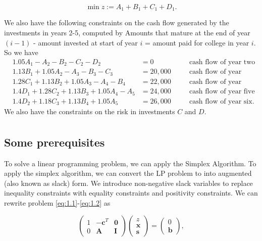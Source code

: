 \documentclass[12pt,english]{article}
\begin{document}
$$
\min z := A_1 + B_1 + C_1 + D_1.
$$

We also have the following constraints on the cash flow generated by the investments in years 2-5, computed by Amounts that mature at the end of year $(i-1)$ - amount invested at start of year $i$ = amount paid for college in year $i$. So we have
$$
\begin{aligned}
&1.05A_1 - A_2 - B_2 - C_2 - D_2 			&= 0 	\quad 	&& \text{cash flow of year two} \\
&1.13B_1 +1.05A_2 - A_3 - B_3 - C_3 		&= 20,000 \quad 	&& \text{cash flow of year three}\\
&1.28C_1 + 1.13B_2 + 1.05A_3 - A_4 - B_4 	&= 22,000	 \quad	&& \text{cash flow of year four} \\
&1.4D_1 + 1.28C_2 + 1.13B_3 + 1.05A_4 -A_5 &=24,000  \quad	&& \text{cash flow of year five}\\
&1.4D_2 + 1.18C_3 + 1.13B_4 + 1.05 A_5	&= 26,000	  \quad	&& \text{cash flow of year six}.
\end{aligned}
$$
We also have the constraints on the risk in investments $C$ and $D$.
$$
\begin{aligned}
\end{aligned}
$$

\subsection{Some prerequisites}

To solve a linear programming problem, we can apply the Simplex Algorithm.   To apply the simplex algorithm, we can convert the LP problem to into augmented (also known as slack) form.  We introduce non-negative slack variables to replace inequality constraints with equality constraints and positivity constraints.   We can rewrite problem \eqref{eq:1.1}-\eqref{eq:1.2} as

\begin{equation}\label{eq:2.1}
\left(
\begin{array}{ccc}
1	&	-\mathbf{c}^T 	&	\mathbf{0} 	\\
0	&	\mathbf{A}		& 	\mathbf{I}
\end{array}
\right)
\left(
\begin{array}{c}
z \\
\mathbf{x} \\
\mathbf{s}
\end{array}
\right)
= 
\left(
\begin{array}{c}
0 \\
\mathbf{b}
\end{array}
\right),
\end{equation}
\end{document}

